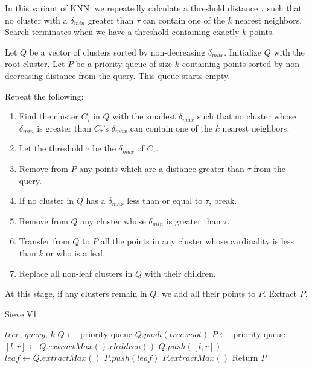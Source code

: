 In this variant of KNN, we repeatedly calculate a threshold distance $\tau$ such that no cluster with a $\delta_{min}$ greater than $\tau$ 
can contain one of the $k$ nearest neighbors. Search terminates when we have a threshold containing exactly $k$ points.

Let $Q$ be a vector of clusters sorted by non-decreasing $\delta_{max}$. Initialize $Q$ with  
the root cluster. 
Let $P$ be a priority queue of size $k$ containing points sorted by non-decreasing distance from the query. This queue starts empty.


Repeat the following: 
\begin{enumerate}
\item Find the cluster $C_{\tau}$ in $Q$ with the smallest $\delta_{max}$ such that no cluster whose $\delta_{min}$ is greater than $C_{\tau}$'s $\delta_{max}$ can contain one of the $k$ nearest neighbors.
\item Let the threshold $\tau$ be the $\delta_{max}$ of $C_{\tau}$.
\item Remove from $P$ any points which are a distance greater than $\tau$ from the query. 
\item If no cluster in $Q$ has a $\delta_{max}$ less than or equal to $\tau$, break.
\item Remove from $Q$ any cluster whose $\delta_{min}$ is greater than $\tau$.
\item Transfer from $Q$ to $P$ all the points in any cluster whose cardinality is less than $k$ or who is a leaf. 
\item Replace all non-leaf clusters in $Q$ with their children. 
\end{enumerate}

At this stage, if any clusters remain in $Q$, we add all their points to $P$. 
Extract $P$. 

\begin{algorithm} %
    \caption{Sieve V1} %
    \label{alg:sieve_v1} %
    \begin{algorithmic}[2] %
        \REQUIRE $tree$, $query$, $k$
        \STATE $Q \leftarrow$ priority queue
        \STATE $Q.push(tree.root)$
        \STATE $P \leftarrow$ priority queue
                \STATE $[l, r] \leftarrow Q.extractMax().children()$
                \STATE $Q.push([l, r])$
            \ENDWHILE
            \STATE $leaf \leftarrow Q.extractMax()$
            \STATE $P.push(leaf)$
                \STATE $P.extractMax()$
            \ENDWHILE
        \ENDWHILE
        \STATE Return $P$
    \end{algorithmic}
    \end{algorithm}

